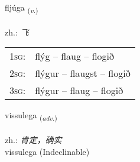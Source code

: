 \documentclass[frontgrid, backgrid]{flacards}\usepackage[]{graphicx}\usepackage[]{xcolor}
\begin{document}
\renewcommand{\flhead}{\vskip5pt \fboxsep=0pt {\small\bfseries\footnotesize Sagnorð | 动词}}
\renewcommand{\fcfoot}{\vskip5pt \fboxsep=0pt \hspace{2pt}{\small\bfseries\footnotesize 1K}}

\renewcommand{\blhead}{\vskip5pt {\small\bfseries\footnotesize Sagnorð | 动词 }}
\renewcommand{\bcfoot}{\vskip5pt \hspace{2pt}{\small\bfseries\footnotesize 1K}}


{fljúga \small{\textsubscript{(\textit{v.})}} \\[1ex] %
\textphonetic{[fljuːɣa]} \\
zh.: \emph{飞} \\  [2ex]
\renewcommand*{\arraystretch}{0.8}
\begin{tabular}{p{1cm}l}
\textsc{1sg}: & flýg -- flaug -- flogið \\ 
\textsc{2sg}: & flýgur -- flaugst -- flogið \\ 
\textsc{3sg}: & flýgur -- flaug -- flogið \\ 
\end{tabular}
}


\renewcommand{\flhead}{\vskip5pt \fboxsep=0pt {\small\bfseries\footnotesize Atviksorð | 副词}}
\renewcommand{\fcfoot}{\vskip5pt \fboxsep=0pt \hspace{2pt}{\small\bfseries\footnotesize 1K}}

\renewcommand{\blhead}{\vskip5pt {\small\bfseries\footnotesize Atviksorð | 副词 }}
\renewcommand{\bcfoot}{\vskip5pt \hspace{2pt}{\small\bfseries\footnotesize 1K}}


{vissulega \small{\textsubscript{(\textit{adv.})}} \\[1ex]
\textphonetic{[vɪsʏlɛɣa]} \\
zh.: \emph{肯定，确实} \\  [2ex]
vissulega (Indeclinable)}

\renewcommand{\flhead}{\vskip5pt \fboxsep=0pt {\small\bfseries\footnotesize Lýsingarorð | 形容词}}
\renewcommand{\fcfoot}{\vskip5pt \fboxsep=0pt \hspace{2pt}{\small\bfseries\footnotesize 1K}}
\end{document}
